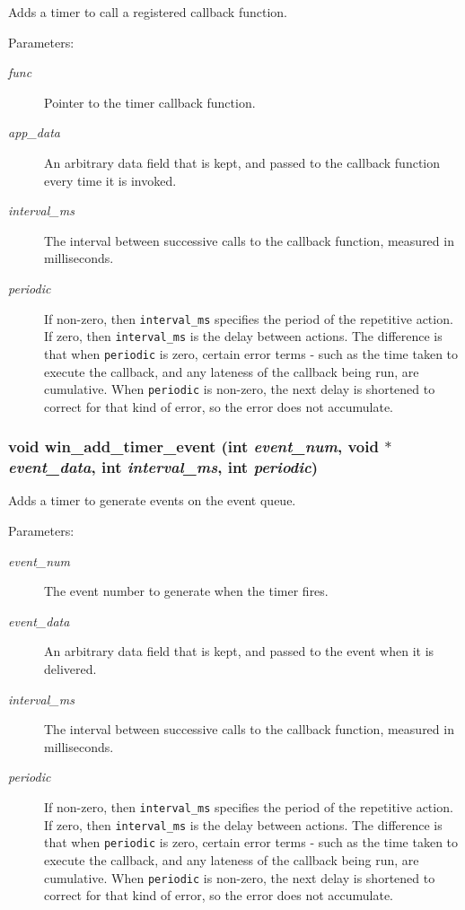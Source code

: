 Adds a timer to call a registered callback function. 

\begin{Desc}
\item[Parameters:]
\begin{description}
\item[{\em func}]Pointer to the timer callback function. \item[{\em app\_\-data}]An arbitrary data field that is kept, and passed to the callback function every time it is invoked. \item[{\em interval\_\-ms}]The interval between successive calls to the callback function, measured in milliseconds. \item[{\em periodic}]If non-zero, then {\tt interval\_\-ms} specifies the period of the repetitive action. If zero, then {\tt interval\_\-ms} is the delay between actions. The difference is that when {\tt periodic} is zero, certain error terms - such as the time taken to execute the callback, and any lateness of the callback being run, are cumulative. When {\tt periodic} is non-zero, the next delay is shortened to correct for that kind of error, so the error does not accumulate. \end{description}
\end{Desc}
\subsubsection{\setlength{\rightskip}{0pt plus 5cm}void win\_\-add\_\-timer\_\-event (int {\em event\_\-num}, void $\ast$ {\em event\_\-data}, int {\em interval\_\-ms}, int {\em periodic})}\label{wintimer_8h_a2}


Adds a timer to generate events on the event queue. 

\begin{Desc}
\item[Parameters:]
\begin{description}
\item[{\em event\_\-num}]The event number to generate when the timer fires. \item[{\em event\_\-data}]An arbitrary data field that is kept, and passed to the event when it is delivered. \item[{\em interval\_\-ms}]The interval between successive calls to the callback function, measured in milliseconds. \item[{\em periodic}]If non-zero, then {\tt interval\_\-ms} specifies the period of the repetitive action. If zero, then {\tt interval\_\-ms} is the delay between actions. The difference is that when {\tt periodic} is zero, certain error terms - such as the time taken to execute the callback, and any lateness of the callback being run, are cumulative. When {\tt periodic} is non-zero, the next delay is shortened to correct for that kind of error, so the error does not accumulate. \end{description}
\end{Desc}
